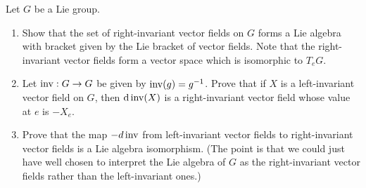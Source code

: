 \documentclass[12pt]{memoir}
\begin{document}

\begin{Ej}
    Let $G$ be a Lie group. 
	\begin{enumerate}
		\item Show that the set of right-invariant vector fields on $G$ forms a Lie algebra with bracket given by the Lie bracket of vector fields. Note that the right-invariant vector fields form a vector space which is isomorphic to $T_eG$.
		
		\item Let $\operatorname{inv}: G \to G$ be given by $\operatorname{inv}(g) = g^{-1}$. Prove that if $X$ is a left-invariant vector field on $G$, then $\dd \operatorname{inv}(X)$ is a right-invariant vector field whose value at $e$ is $-X_e$.
		
		\item Prove that the map $-d\operatorname{inv}$ from left-invariant vector fields to right-invariant vector fields is a Lie algebra isomorphism. (The point is that we could just have well chosen to interpret the Lie algebra of $G$ as the right-invariant vector fields rather than the left-invariant ones.)
	\end{enumerate}
\end{Ej}





\iffalse
First let us recall that a left-invariant vector field is an $X\in\cX(G)$ such that 
		$$\dd L_gX=X,\word{i.e.}\left(\dd L_g\right)_h (X(h)) = X(gh).$$ 
		So in a similar fashion a right-invariant vector field should be an $X\in\cX(G)$ such that $\dd R_gX=X$. This is, for $h\in G$
		$$\left(\dd R_g\right)_h (X(h)) = X(hg)$$
		where the action of $R_g$ is 
		$$R_g(h)=hg,\word{for}h\in G.$$
		Call $\g^R$ the set of right-invariant vector fields, it suffices to show that the Lie bracket of two right-invariant vector fields is also right-invariant. To that effect we employ Lemma 3.3.8, we have that 
		$$\dd R_g([X,Y](h))=[X,Y](R_g(h))=[X,Y](hg).$$
\fi
\end{document}
